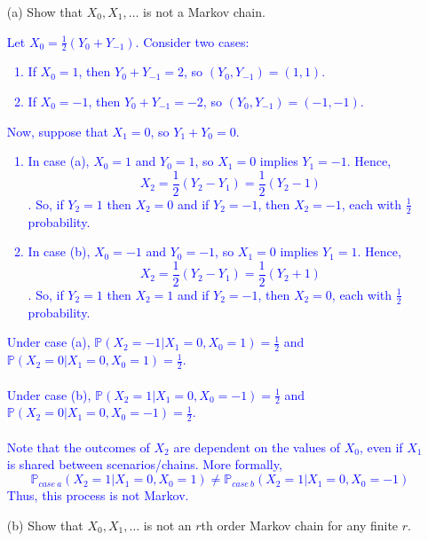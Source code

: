 \documentclass{article}
\begin{document}
\begin{enumerate}
    \item[(a)] Show that $X_0, X_1, \ldots$ is not a Markov chain.

        \textcolor{blue}{Let $X_0=\frac{1}{2}(Y_0 + Y_{-1})$. Consider two cases: 
            \begin{enumerate}
                \item If $X_0=1$, then $Y_0 + Y_{-1} = 2$, so $(Y_0,Y_{-1})=(1,1)$.
                \item If $X_0=-1$, then $Y_0 + Y_{-1} = -2$, so $(Y_0,Y_{-1})=(-1,-1)$.
            \end{enumerate}
        Now, suppose that $X_1=0$, so $Y_1 + Y_0 = 0$.
            \begin{enumerate}
                \item In case (a), $X_0=1$ and $Y_0=1$, so $X_1=0$ implies $Y_1=-1$. Hence, $$X_2 = \frac{1}{2}(Y_2-Y_1) = \frac{1}{2}(Y_2 - 1)$$. So, if $Y_2=1$ then $X_2=0$ and if $Y_2=-1$, then $X_2=-1$, each with $\frac{1}{2}$ probability.
                \item In case (b), $X_0=-1$ and $Y_0=-1$, so $X_1=0$ implies $Y_1=1$. Hence, $$X_2 = \frac{1}{2}(Y_2-Y_1) = \frac{1}{2}(Y_2 + 1)$$. So, if $Y_2=1$ then $X_2=1$ and if $Y_2=-1$, then $X_2=0$, each with $\frac{1}{2}$ probability.
            \end{enumerate}
            Under case (a), $\mathbb{P}(X_2=-1 | X_1 = 0, X_0 = 1) = \frac{1}{2}$ and $\mathbb{P}(X_2=0 | X_1 = 0, X_0 = 1) = \frac{1}{2}$. \\ \\ 
            Under case (b), $\mathbb{P}(X_2=1 | X_1 = 0, X_0 = -1) = \frac{1}{2}$ and $\mathbb{P}(X_2=0 | X_1 = 0, X_0 = -1) = \frac{1}{2}$. \\ \\ 
            Note that the outcomes of $X_2$ are dependent on the values of $X_0$, even if $X_1$ is shared between scenarios/chains. More formally, $$\mathbb{P}_{case \ a}(X_2=1 | X_1=0, X_0=1) \neq \mathbb{P}_{case \ b}(X_2=1 | X_1 = 0, X_0 = -1)$$ Thus, this process is not Markov.
        }


    \item[(b)] Show that $X_0, X_1, \ldots$ is not an $r$th order Markov chain for any finite $r$.


\end{enumerate}
\end{document}
